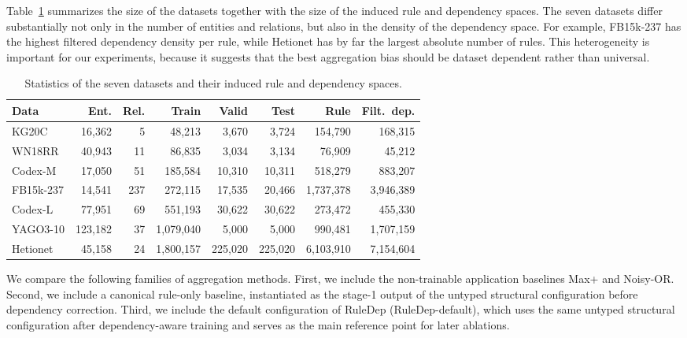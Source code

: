 Table~\ref{tab:exp-datasets} summarizes the size of the datasets together with the size of the induced rule and dependency spaces. The seven datasets differ substantially not only in the number of entities and relations, but also in the density of the dependency space. For example, FB15k-237 has the highest filtered dependency density per rule, while Hetionet has by far the largest absolute number of rules. This heterogeneity is important for our experiments, because it suggests that the best aggregation bias should be dataset dependent rather than universal.

\begin{table}[t]
\centering
\caption{Statistics of the seven datasets and their induced rule and dependency spaces.}
\label{tab:exp-datasets}
\setlength{\tabcolsep}{2.2pt}
\renewcommand{\arraystretch}{1.1}
\footnotesize
\begin{tabular}{lrrrrrrr}
\toprule
Data & Ent. & Rel. & Train & Valid & Test & Rule & Filt.\ dep. \\
\midrule
KG20C      & 16,362   & 5   & 48,213    & 3,670   & 3,724   & 154,790   & 168,315   \\
WN18RR     & 40,943   & 11  & 86,835    & 3,034   & 3,134   & 76,909    & 45,212    \\
Codex-M    & 17,050   & 51  & 185,584   & 10,310  & 10,311  & 518,279   & 883,207   \\
FB15k-237  & 14,541   & 237 & 272,115   & 17,535  & 20,466  & 1,737,378 & 3,946,389 \\
Codex-L    & 77,951   & 69  & 551,193   & 30,622  & 30,622  & 273,472   & 455,330   \\
YAGO3-10   & 123,182  & 37  & 1,079,040 & 5,000   & 5,000   & 990,481   & 1,707,159 \\
Hetionet   & 45,158   & 24  & 1,800,157 & 225,020 & 225,020 & 6,103,910 & 7,154,604 \\
\bottomrule
\end{tabular}
\end{table}

We compare the following families of aggregation methods. First, we include the non-trainable application baselines Max+ and Noisy-OR. Second, we include a canonical rule-only baseline, instantiated as the stage-1 output of the untyped structural configuration before dependency correction. Third, we include the default configuration of RuleDep (RuleDep-default), which uses the same untyped structural configuration after dependency-aware training and serves as the main reference point for later ablations.

